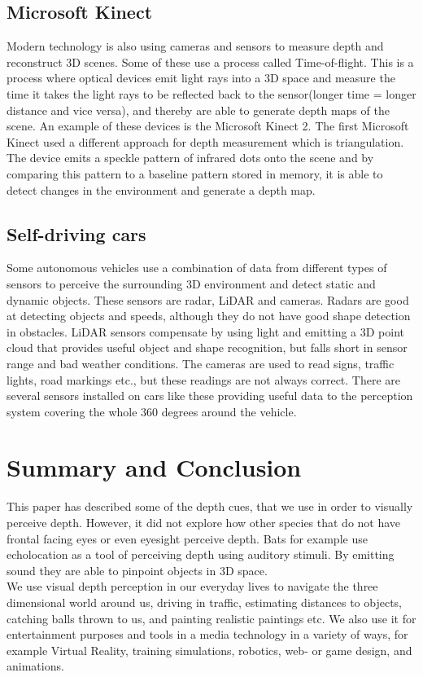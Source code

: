 	\subsection{Microsoft Kinect}
	Modern technology is also using cameras and sensors to measure depth and reconstruct 3D scenes. Some of these use a process called Time-of-flight. This is a process where optical devices emit light rays into a 3D space and measure the time it takes the light rays to be reflected back to the sensor(longer time = longer distance and vice versa), and thereby are able to generate depth maps of the scene. An example of these devices is the Microsoft Kinect 2\citep{tof}. The first Microsoft Kinect used a different approach for depth measurement which is triangulation. The device emits a speckle pattern of infrared dots onto the scene and by comparing this pattern to a baseline pattern stored in memory, it is able to detect changes in the environment and generate a depth map\citep{pointCloud}.
	
	\subsection{Self-driving cars}
	Some autonomous vehicles use a combination of data from different types of sensors to perceive the surrounding 3D environment and detect static and dynamic objects. These sensors are radar, LiDAR and cameras. Radars are good at detecting objects and speeds, although they do not have good shape detection in obstacles. LiDAR sensors compensate by using light and emitting a 3D point cloud that provides useful object and shape recognition, but falls short in sensor range and bad weather conditions. The cameras are used to read signs, traffic lights, road markings etc., but these readings are not always correct. There are several sensors installed on cars like these providing useful data to the perception system covering the whole 360 degrees around the vehicle\citep{selfdrivingCars}.
	

\section{Summary and Conclusion}
This paper has described some of the depth cues, that we use in order to visually perceive depth. However, it did not explore how other species that do not have frontal facing eyes or even eyesight perceive depth. Bats for example use echolocation as a tool of perceiving depth using auditory stimuli. By emitting sound they are able to pinpoint objects in 3D space\citep[p.~381]{sensationPerception}.\\

We use visual depth perception in our everyday lives to navigate the three dimensional world around us, driving in traffic, estimating distances to objects, catching balls thrown to us, and painting realistic paintings etc. We also use it for entertainment purposes and tools in a media technology in a variety of ways, for example Virtual Reality, training simulations, robotics, web- or game design, and animations.

